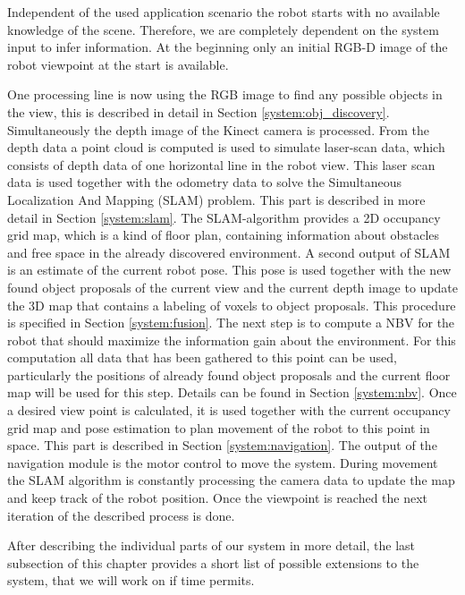 \documentclass[a4paper,11pt,english]{article}
\begin{document}
Independent of the used application scenario the robot starts with no available knowledge of the scene.
Therefore, we are completely dependent on the system input to infer information.
At the beginning only an initial RGB-D image of the robot viewpoint at the start is available.

One processing line is now using the RGB image to find any possible objects in the view, this is described in detail in Section \ref{system:obj_discovery}.
Simultaneously the depth image of the Kinect camera is processed.
From the depth data a point cloud is computed is used to simulate laser-scan data, which consists of depth data of one horizontal line in the robot view. 
This laser scan data is used together with the odometry data to solve the Simultaneous Localization And Mapping (SLAM) problem. This part is described in more detail in Section \ref{system:slam}.
The SLAM-algorithm provides a 2D occupancy grid map, which is a kind of floor plan, containing information about obstacles and free space in the already discovered environment. A second output of SLAM is an estimate of the current robot pose.
This pose is used together with the new found object proposals of the current view and the current depth image to update the 3D map that contains a labeling of voxels to object proposals. This procedure is specified in Section \ref{system:fusion}. 
The next step is to compute a NBV for the robot that should maximize the information gain about the environment.
For this computation all data that has been gathered to this point can be used, particularly the positions of already found object proposals and the current floor map will be used for this step. Details can be found in Section \ref{system:nbv}.
Once a desired view point is calculated, it is used together with the current occupancy grid map and pose estimation to plan movement of the robot to this point in space.
This part is described in Section \ref{system:navigation}.
The output of the navigation module is the motor control to move the system.
During movement the SLAM algorithm is constantly processing the camera data to update the map and keep track of the robot position.
Once the viewpoint is reached the next iteration of the described process is done.

After describing the individual parts of our system in more detail, the last subsection of this chapter provides a short list of possible extensions to the system, that we will work on if time permits.
\end{document}
